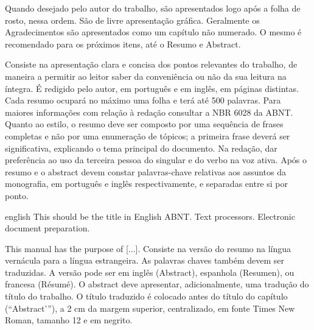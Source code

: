 \documentclass[
	oneside,
	english,brazil,
	mestrado,ppgc]{infufrgs}
\begin{document}
\imprimirfolhaderosto*

\imprimircip

\begin{agradecimentos}
    Quando desejado pelo autor do trabalho, são apresentados logo após a folha
    de rosto, nessa ordem. São de livre apresentação gráfica. Geralmente os
    Agradecimentos são apresentados como um capítulo não numerado. O mesmo é
    recomendado para os próximos itens, até o Resumo e Abstract.
\end{agradecimentos}

\begin{resumo}
    Consiste na apresentação clara e concisa dos pontos relevantes do trabalho,
    de maneira a permitir ao leitor saber da conveniência ou não da sua leitura
    na íntegra. É redigido pelo autor, em português e em inglês, em páginas
    distintas. Cada resumo ocupará no máximo uma folha e terá até 500 palavras.
    Para maiores informações com relação à redação consultar a NBR 6028 da
    ABNT. Quanto ao estilo, o resumo deve ser composto por uma sequência de
    frases completas e não por uma enumeração de tópicos; a primeira frase
    deverá ser significativa, explicando o tema principal do documento. Na
    redação, dar preferência ao uso da terceira pessoa do singular e do verbo
    na voz ativa. Após o resumo e o abstract devem constar palavras-chave
    relativas aos assuntos da monografia, em português e inglês
    respectivamente, e separadas entre si por ponto.
\end{resumo}

\begin{resumoestrangeiro}{english}
	{This should be the title in English}
	{ABNT. Text processors. Electronic document preparation.}

    This manual has the purpose of [...]. Consiste na versão do resumo na
    língua vernácula para a língua estrangeira. As palavras chaves também devem
    ser traduzidas. A versão pode ser em inglês (Abstract), espanhola
    (Resumen), ou francesa (Résumé). O abstract deve apresentar,
    adicionalmente, uma tradução do título do trabalho. O título traduzido é
    colocado antes do título do capítulo (“Abstract’”), a 2 cm da margem
    superior, centralizado, em fonte Times New Roman, tamanho 12 e em negrito.
\end{resumoestrangeiro}

\listoffigures*
\cleardoublepage
\end{document}
